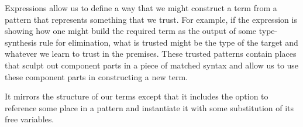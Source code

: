 
Expressions allow us to define a way that we might construct a term from a
pattern that represents something that we trust. For example, if the expression
is showing how one might build the required term as the output of some
type-synthesis rule for elimination, what is trusted might be the type of the
target and whatever we learn to trust in the premises. These trusted patterns
contain places that sculpt out component parts in a piece of matched syntax
and allow us to use these component parts in constructing a new term.

It mirrors the structure of our terms except that it includes the option
to reference some place in a pattern and instantiate it with some substitution
of its free  variables.

